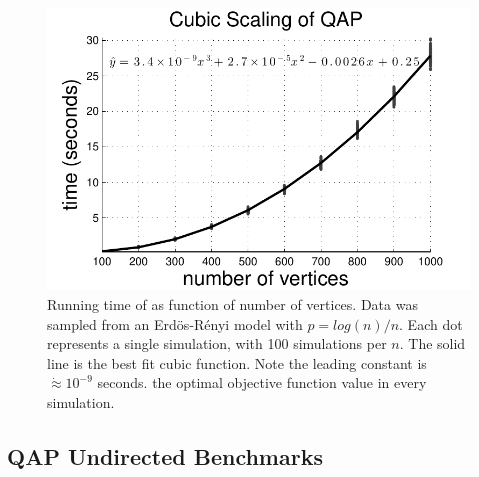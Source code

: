 \documentclass[10pt,journal,cspaper,compsoc]{IEEEtran}
\begin{document}
\begin{figure}[htbp]
	\centering			
	\includegraphics[width=1.0\linewidth]{../figs/ErdosRenyi_results.pdf}
	\caption{Running time of \FAQ as function of number of vertices. Data was sampled from an Erd\"os-R\'enyi model with $p=log(n)/n$.  Each dot represents a single simulation, with 100 simulations per $n$.  The solid line is the best fit cubic function.  Note the leading constant is $\dot{\approx} 10^{-9}$ seconds. \FAQ the optimal objective function value in every simulation.}
	\label{fig:scaling}
\end{figure}



\subsection{QAP Undirected Benchmarks}
\label{sub:undirected}
\end{document}
